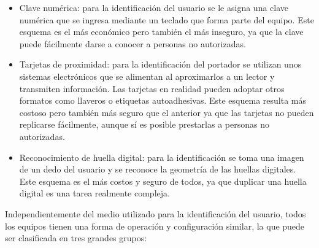 \begin{itemize}
	\item Clave numérica: para la identificación del usuario se le asigna una clave numérica que se ingresa mediante un teclado que forma parte del equipo. Este esquema es el más económico pero también el más inseguro, ya que la clave puede fácilmente darse a conocer a personas no autorizadas. 
	\item Tarjetas de proximidad: para la identificación del portador se utilizan unos sistemas electrónicos que se alimentan al aproximarlos a un lector y transmiten información. Las tarjetas en realidad pueden adoptar otros formatos como llaveros o etiquetas autoadhesivas. Este esquema resulta más costoso pero también más seguro que el anterior ya que las tarjetas no pueden replicarse fácilmente, aunque sí es posible prestarlas a personas no autorizadas.
	\item Reconocimiento de huella digital: para la identificación se toma una imagen de un dedo del usuario y se reconoce la geometría de las huellas digitales. Este esquema es el más costos y seguro de todos, ya que duplicar una huella digital es una tarea realmente compleja.
\end{itemize}

Independientemente del medio utilizado para la identificación del usuario, todos los equipos tienen una forma de operación y configuración similar, la que puede ser clasificada en tres grandes grupos:

